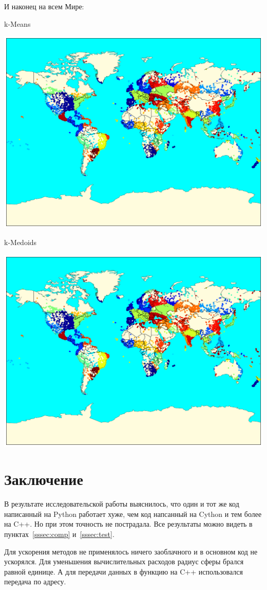 \documentclass[12pt, a4paper]{article}
\begin{document}
			\newpage
			\begin{center}
				И наконец на всем Мире:

				k-Means

				\includegraphics[width=15cm]{W_k_means.pdf}

				k-Medoids

				\includegraphics[width=15cm]{W_k_means.pdf}
			\end{center}


	\newpage
	\section{Заключение}
		В результате исследовательской работы выяснилось, что один и тот же код написанный на Python работает хуже, чем код напсанный на Cython и тем более на C++. Но при этом точность не пострадала. Все результаты можно видеть в пунктах~\ref{sssec:comp} и~\ref{sssec:test}.

		Для ускорения методов не применялось ничего заоблачного и в основном код не ускорялся. Для уменьшения вычислительных расходов радиус сферы брался равной единице. А для передачи данных в функцию на C++ использовался передача по адресу.
\end{document}
